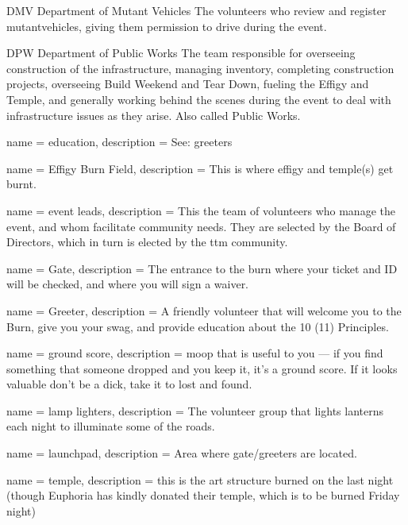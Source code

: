 {DMV}
{Department of Mutant Vehicles}
{The volunteers who review and register \gls{mutantvehicles}, giving them permission to drive during the event.}


{DPW}
{Department of Public Works}
{The team responsible for overseeing construction of the infrastructure, managing inventory, completing construction projects, overseeing Build Weekend and Tear Down, fueling the Effigy and Temple, and generally working behind the scenes during the event to deal with infrastructure issues as they arise. Also called Public Works.}

 {
name = {education},
description = {See: \glspl{greeter}}
}

 {
name = {Effigy Burn Field},
description = {This is where effigy and temple(s) get burnt.}
}

 {
name = {event leads},
description = {This the team of volunteers who manage the event, and whom facilitate community needs. They are selected by the Board of Directors, which in turn is elected by the \gls{ttm} community.}
}

 {
name = {Gate},
description = {The entrance to the burn where your ticket and ID will be checked, and where you will sign a waiver.}
}

 {
name = {Greeter},
description = {A friendly volunteer that will welcome you to the Burn, give you your \gls{swag}, and provide \gls{education} about the 10 (11) Principles. }
}

 {
name = {ground score},
description = {\gls{moop} that is useful to you --- if you find something that someone dropped and you keep it, it's a ground score. If it looks valuable don’t be a dick, take it to lost and found. }
}

 {
name = {lamp lighters},
description = {The volunteer group that lights lanterns each night to illuminate some of the roads.}
}

 {
name = {launchpad},
description = {Area where \gls{gate}/\glspl{greeter} are located.}
}

 {
name = {temple},
description = {this is the art structure burned on the last night (though Euphoria has kindly donated their temple, which is to be burned Friday night)}
}

